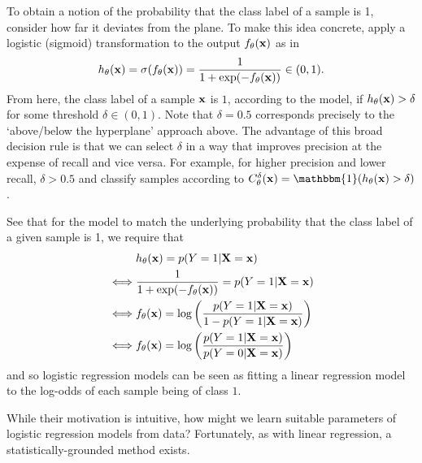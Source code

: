 \documentclass[11pt]{article}
\begin{document}
To obtain a notion of the probability that the class label of a sample is 1, consider how far it deviates from the plane. To make this idea concrete, apply a logistic (sigmoid) transformation to the output $f_{\theta}(\mathbf{x})$ as in
$$
h_{\theta}(\mathbf{x})
=
\sigma(f_{\theta}(\mathbf{x}))
=
\frac{1}{1+\exp(-f_{\theta}(\mathbf{x}))}\in(0,1).
$$
From here, the class label of a sample $\mathbf{x}$ is $1$, according to the model, if $h_{\theta}(\mathbf{x})>\delta$ for some threshold $\delta\in(0,1)$. Note that $\delta=0.5$ corresponds precisely to the `above/below the hyperplane' approach above. The advantage of this broad decision rule is that we can select $\delta$ in a way that improves precision at the expense of recall and vice versa. For example, for higher precision and lower recall, $\delta>0.5$ and classify samples according to $C_{\theta}^{\delta}(\x)=\mathbbm{1}(h_{\theta}(\x)>\delta)$.

See that for the model to match the underlying probability that the class label of a given sample is 1, we require that
\begin{align*}
    &h_{\theta}(\mathbf{x})=p(Y=1|\mathbf{X}=\mathbf{x})\\
    \iff & \frac{1}{1+\exp(-f_{\theta}(\mathbf{x}))}=p(Y=1|\mathbf{X}=\mathbf{x})\\
    \iff & f_{\theta}(\mathbf{x}) = \log\left(\frac{p(Y=1|\mathbf{X}=\mathbf{x})}{1-p(Y=1|\mathbf{X}=\mathbf{x})}\right)\\
    \iff & f_{\theta}(\mathbf{x}) = \log\left(\frac{p(Y=1|\mathbf{X}=\mathbf{x})}{p(Y=0|\mathbf{X}=\mathbf{x})}\right)
\end{align*}
and so logistic regression models can be seen as fitting a linear regression model to the log-odds of each sample being of class $1$.

While their motivation is intuitive, how might we learn suitable parameters of logistic regression models from data? Fortunately, as with linear regression, a statistically-grounded method exists.
\end{document}
